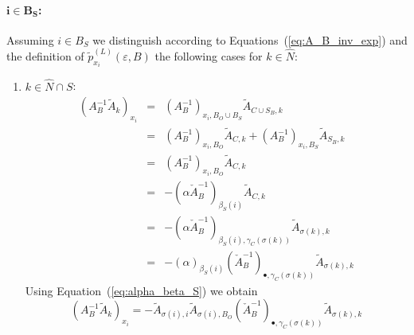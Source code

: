 \documentclass[a4paper]{article}
\begin{document}
\paragraph{$\mathbf{i \in B_{S}}$:}
Assuming $i \in B_{S}$ we distinguish
according to Equations~(\ref{eq:A_B_inv_exp})
and the definition of $\tilde{p}_{x_{i}}^{(L)}(\varepsilon, B)$
the following cases for $k \in \hat{N}$:
\begin{enumerate}
\item $k \in \hat{N} \cap S$:
\begin{eqnarray}
  (A_{B}^{-1}\tilde{A}_{k})_{x_{i}} &=& 
  (A_{B}^{-1})_{x_{i}, B_{O} \cup B_{S}}\tilde{A}_{C \cup S_{B}, k}
  \nonumber \\
  &=& 
  (A_{B}^{-1})_{x_{i}, B_{O}}\tilde{A}_{C, k} +
  (A_{B}^{-1})_{x_{i}, B_{S}}\tilde{A}_{S_{B}, k}
  \nonumber \\
  &=&
  (A_{B}^{-1})_{x_{i}, B_{O}}\tilde{A}_{C, k}
  \nonumber \\ 
  &=&
  -\left(\alpha\check{A}_{B}^{-1}\right)_{\beta_{S}(i)}\tilde{A}_{C, k}
  \nonumber \\
  &=&
  -\left(\alpha\check{A}_{B}^{-1}\right)_{\beta_{S}(i), \gamma_{C}(\sigma(k))}
  \tilde{A}_{\sigma(k), k}
  \nonumber \\
  &=&
  -\left(\alpha\right)_{\beta_{S}(i)}
  \left(\check{A}_{B}^{-1}\right)_{\bullet, \gamma_{C}(\sigma(k))}
  \tilde{A}_{\sigma(k), k}
  \nonumber
\end{eqnarray}
Using Equation~(\ref{eq:alpha_beta_S}) we obtain
\begin{equation}
(A_{B}^{-1}\tilde{A}_{k})_{x_{i}} =
  -\tilde{A}_{\sigma(i), i}\tilde{A}_{\sigma(i), B_{O}}
  \left(\check{A}_{B}^{-1}\right)_{\bullet, \gamma_{C}(\sigma(k))}
  \tilde{A}_{\sigma(k), k}
\end{equation}


\end{enumerate}
\end{document}
